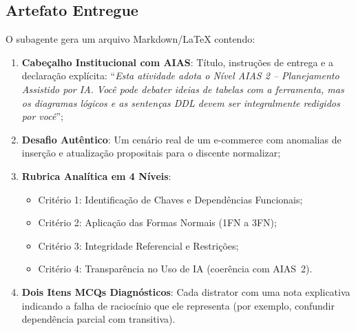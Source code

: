 \subsection{Artefato Entregue}
O subagente gera um arquivo Markdown/LaTeX contendo:
\begin{enumerate}
  \item \textbf{Cabe{\c c}alho Institucional com AIAS}: T{\'i}tulo, instru{\c c}{\~o}es de entrega e a declara{\c c}{\~a}o expl{\'i}cita: ``\emph{Esta atividade adota o N{\'i}vel AIAS 2 -- Planejamento Assistido por IA. Voc{\^e} pode debater ideias de tabelas com a ferramenta, mas os diagramas l{\'o}gicos e as senten{\c c}as DDL devem ser integralmente redigidos por voc{\^e}}'';
  \item \textbf{Desafio Aut{\^e}ntico}: Um cen{\'a}rio real de um e-commerce com anomalias de inser{\c c}{\~a}o e atualiza{\c c}{\~a}o propositais para o discente normalizar;
  \item \textbf{Rubrica Anal{\'i}tica em 4 N{\'i}veis}:
    \begin{itemize}
      \item Crit{\'e}rio 1: Identifica{\c c}{\~a}o de Chaves e Depend{\^e}ncias Funcionais;
      \item Crit{\'e}rio 2: Aplica{\c c}{\~a}o das Formas Normais (1FN a 3FN);
      \item Crit{\'e}rio 3: Integridade Referencial e Restri{\c c}{\~o}es;
      \item Crit{\'e}rio 4: Transpar{\^e}ncia no Uso de IA (coer{\^e}ncia com AIAS~2).
    \end{itemize}
  \item \textbf{Dois Itens MCQs Diagn{\'o}sticos}: Cada distrator com uma nota explicativa indicando a falha de racioc{\'i}nio que ele representa (por exemplo, confundir depend{\^e}ncia parcial com transitiva).
\end{enumerate}

